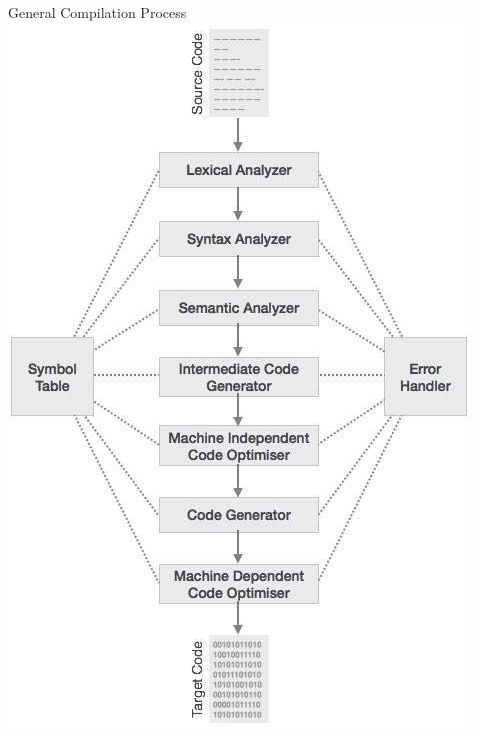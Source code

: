 \documentclass{beamer}
\begin{document}
\begin{frame}{General Compilation Process}
    \centering
    \includegraphics[scale=0.325]{images/low_level_compilation.jpg}\cite{low_level_compilation}
\end{frame}
\end{document}
